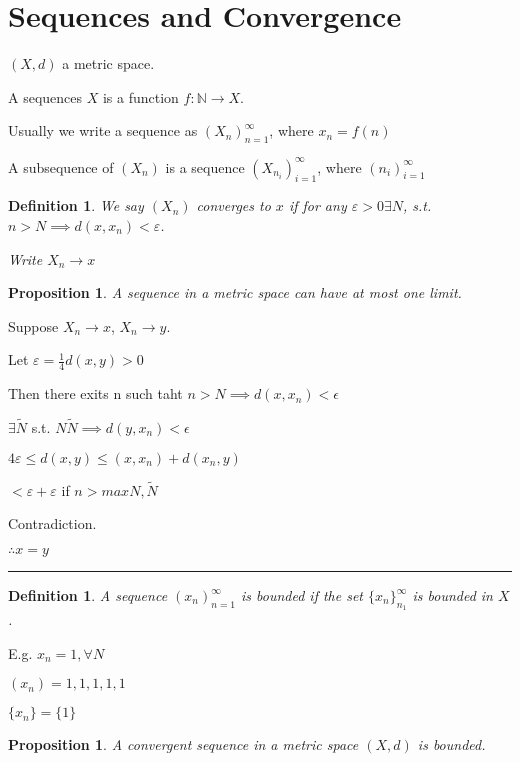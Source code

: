 \documentclass[twoside]{article}
\newcommand{\N}{\mathbb{N}}
\newtheorem{proposition}[theorem]{Proposition}
\newtheorem{definition}[theorem]{Definition}
\newenvironment{proof}{{\bf Proof:}}{\hfill\rule{2mm}{2mm}}
\begin{document}
\section{Sequences and Convergence}

$(X,d)$ a metric space. 

A sequences $X$ is a function $f: \N \rightarrow X$.

Usually we write a sequence as $(X_n)_{n=1}^{\infty}$, where $x_n = f(n)$

A subsequence of $(X_n)$ is a sequence $(X_{n_i})_{i=1}^{\infty}$, where $(n_i)_{i=1}^{\infty}$

\begin{definition}
    We say $(X_n)$ converges to $x$ if for any $\varepsilon > 0 \exists N$, s.t. $n > N \implies d(x,x_n) < \varepsilon$.

    Write $X_n \rightarrow x$
\end{definition}

\begin{proposition}
    A sequence in a metric space can have at most one limit. 
\end{proposition}

\begin{proof}
    Suppose $X_n \rightarrow x$, $X_n \rightarrow y$.

    Let $\varepsilon = \frac14d(x,y) > 0$

    Then there exits n such taht $n > N \implies d(x,x_n) < \epsilon$

    $\exists \tilde N$ s.t. $N \tilde N \implies d(y,x_n) < \epsilon$

    $4\varepsilon \leq d(x,y) \leq(x,x_n) + d(x_n,y)$

    $< \varepsilon + \varepsilon$ if $n > max{N, \tilde N}$

    Contradiction. 

    $\therefore x = y$
\end{proof}

\begin{definition}
    A sequence $(x_n)_{n=1}^\infty$ is bounded if the set $\{x_n\}_{n_1}^\infty$ is bounded in $X$.
\end{definition}

E.g. $x_n = 1, \forall N$

$(x_n) = 1,1,1,1,1$

$\{x_n\} = \{1\}$

\begin{proposition}
    A convergent sequence in a metric space $(X,d)$ is bounded. 
\end{proposition}
\end{document}
